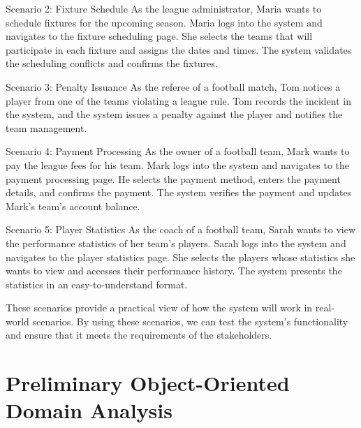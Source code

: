\documentclass[12pt]{article}
\begin{document}
Scenario 2: Fixture Schedule
As the league administrator, Maria wants to schedule fixtures for the upcoming season. Maria logs into the system and navigates to the fixture scheduling page. She selects the teams that will participate in each fixture and assigns the dates and times. The system validates the scheduling conflicts and confirms the fixtures.

Scenario 3: Penalty Issuance
As the referee of a football match, Tom notices a player from one of the teams violating a league rule. Tom records the incident in the system, and the system issues a penalty against the player and notifies the team management.

Scenario 4: Payment Processing
As the owner of a football team, Mark wants to pay the league fees for his team. Mark logs into the system and navigates to the payment processing page. He selects the payment method, enters the payment details, and confirms the payment. The system verifies the payment and updates Mark's team's account balance.

Scenario 5: Player Statistics
As the coach of a football team, Sarah wants to view the performance statistics of her team's players. Sarah logs into the system and navigates to the player statistics page. She selects the players whose statistics she wants to view and accesses their performance history. The system presents the statistics in an easy-to-understand format.

These scenarios provide a practical view of how the system will work in real-world scenarios. By using these scenarios, we can test the system's functionality and ensure that it meets the requirements of the stakeholders.

\section{Preliminary Object-Oriented Domain Analysis}

\end{document}
